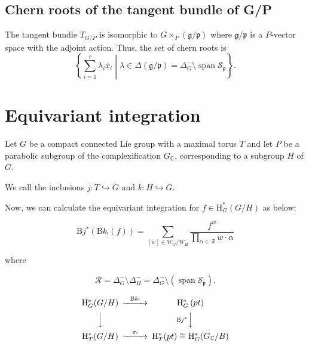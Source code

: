 \documentclass[uplatex,dvipdfmx]{jsarticle}
\begin{document}
\subsection{Chern roots of the tangent bundle of G/P}

The tangent bundle 
$T_{G/P}$
is isomorphic to
$G \times_P (\mathfrak{g}/\mathfrak{p})$
where
$\mathfrak{g}/\mathfrak{p}$
is a 
$P$-vector space 
with the adjoint action.
Thus, the set of chern roots is
\begin{equation}
    \left\{ 
        \sum_{i = 1}^r
        \lambda_i
        x_i
        \middle|
        \lambda \in \Delta(\mathfrak{g}/\mathfrak{p})
        =
        \Delta^-_G 
        \setminus
        \operatorname{span} \mathcal{S}_\mathfrak{p}
    \right\}.
\end{equation}

\section{Equivariant integration}

Let 
$G$ 
be a compact connected Lie group with a maximal torus
$T$
and let
$P$
be a parabolic subgroup of the complexification 
$G_{\mathbb{C}}$,
corresponding to a subgroup
$H$
of
$G$.

We call the inclusions
$j \colon T \hookrightarrow G$
and
$k \colon H \hookrightarrow G$.

Now, we can calculate the equivariant integration for 
$f \in \mathrm{H}^*_G(G/H)$ 
as below:

\begin{equation}
    \mathrm{B}j^*\left( 
        \mathrm{B}k_! \left( 
            f
        \right)
    \right)
    =
    \sum_{
        [w] \in W_G / W_H
    }
    \frac{f^w}{\prod_{\alpha \in \mathcal{R}} w \cdot \alpha}
\end{equation}

where

\begin{equation}
    \mathcal{R}
    =
    \Delta_G^- \setminus \Delta_H^-
    =
    \Delta_G^- \setminus (\operatorname{span} \mathcal{S}_\mathfrak{p}).
\end{equation}

\begin{equation}
    \begin{CD}
        \mathrm{H}^*_G(G/H) @>{\mathrm{B}k_!}>> \mathrm{H}_G^*\left( pt \right) \\
        @VVV    @V{\mathrm{B}j^*}VV \\
        \mathrm{H}^*_T(G/H) @>{\pi_!}>> \mathrm{H}^*_T(pt) \cong \mathrm{H}^*_G(G_\mathbb{C}/B)
     \end{CD}
\end{equation}
\end{document}
